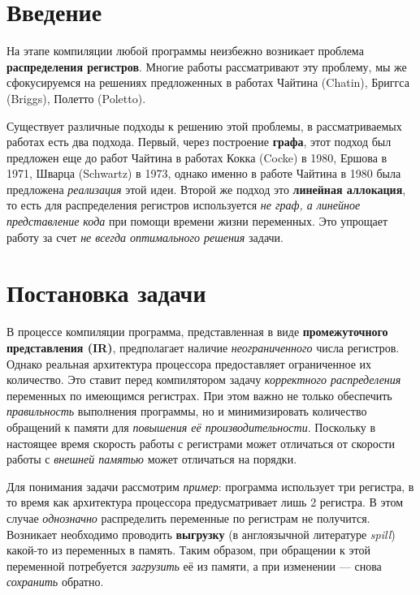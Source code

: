 \documentclass[12pt]{article}
\begin{document}
\section{Введение}

На этапе компиляции любой программы неизбежно возникает проблема \textbf{распределения регистров}. %
Многие работы рассматривают эту проблему, мы же сфокусируемся на решениях предложенных в
работах Чайтина (Chatin), Бриггса (Briggs), Полетто (Poletto). %

Существует различные подходы к решению этой проблемы, в рассматриваемых работах есть два
подхода. Первый, через построение \textbf{графа}, этот подход был предложен еще до работ Чайтина в
работах Кокка (Cocke) в 1980, Ершова в 1971, Шварца (Schwartz) в 1973, однако именно в
работе Чайтина в 1980 была предложена \textit{реализация} этой идеи. Второй же подход это \textbf{линейная аллокация},
то есть для распределения регистров используется \textit{не граф, а линейное представление кода} при
помощи времени жизни переменных. Это упрощает работу за счет \textit{не всегда оптимального решения} задачи.

\section{Постановка задачи}
В процессе компиляции программа, представленная в виде \textbf{промежуточного представления (IR)}, предполагает
наличие \textit{неограниченного} числа регистров. Однако реальная архитектура процессора предоставляет ограниченное
их количество. Это ставит перед компилятором задачу \textit{корректного распределения} переменных по имеющимся
регистрах. При этом важно не только обеспечить \textit{правильность} выполнения программы, но и минимизировать
количество обращений к памяти для \textit{повышения её производительности}. Поскольку в настоящее время
скорость работы с регистрами может отличаться от скорости работы с \textit{внешней памятью} может отличаться на
порядки.

Для понимания задачи рассмотрим \textit{пример}: программа использует три регистра, в то время как архитектура
процессора предусматривает лишь 2 регистра. В этом случае \textit{однозначно} распределить переменные по регистрам
не получится. Возникает необходимо проводить \textbf{выгрузку} (в англоязычной литературе \textit{spill})
какой-то из переменных в память. Таким образом, при обращении к этой переменной потребуется \textit{загрузить}
её из памяти, а при изменении — снова \textit{сохранить} обратно.
\end{document}
